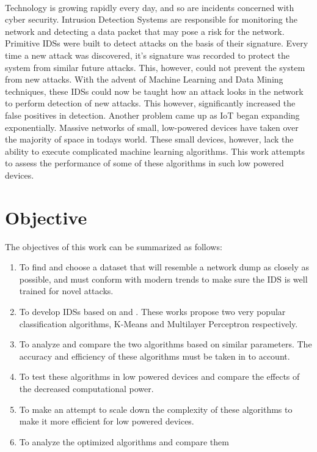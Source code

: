 \documentclass[a4paper,12pt]{article}
\begin{document}
	\paragraph{}
	Technology is growing rapidly every day, and so are incidents concerned with cyber security. Intrusion Detection Systems are responsible for monitoring the network and detecting a data packet that may pose a risk for the network. Primitive IDSs were built to detect attacks on the basis of their signature. Every time a new attack was discovered, it's signature was recorded to protect the system from similar future attacks. This, however, could not prevent the system from new attacks. With the advent of Machine Learning and Data Mining techniques, these IDSs could now be taught how an attack looks in the network to perform detection of new attacks. This however, significantly increased the false positives in detection. Another problem came up as IoT began expanding exponentially. Massive networks of small, low-powered devices have taken over the majority of space in todays world. These small devices, however, lack the ability to execute complicated machine learning algorithms. This work attempts to assess the performance of some of these algorithms in such low powered devices.

	\section{Objective}
    The objectives of this work can be summarized as follows:
	\begin{enumerate}
		\item To find and choose a dataset that will resemble a network dump as closely as possible, and must conform with modern trends to make sure the IDS is well trained for novel attacks.
		\item To develop IDSs based on \cite{dm15} and \cite{mlp17}. These works propose two very popular classification algorithms, K-Means and Multilayer Perceptron respectively.
		\item To analyze and compare the two algorithms based on similar parameters. The accuracy and efficiency of these algorithms must be taken in to account.
		\item To test these algorithms in low powered devices and compare the effects of the decreased computational power.
		\item To make an attempt to scale down the complexity of these algorithms to make it more efficient for low powered devices.
        \item To analyze the optimized algorithms and compare them
	\end{enumerate}
\end{document}
